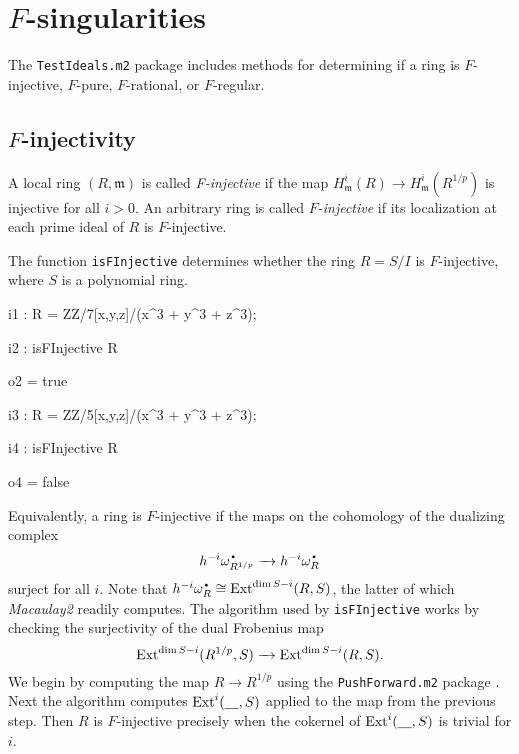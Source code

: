 \documentclass{amsart}
\begin{document}
\section{$F$-singularities}\label{Section: F-singularities}

The \texttt{TestIdeals.m2} package includes methods for determining if a ring is $F$-injective, $F$-pure, $F$-rational, or $F$-regular.

\subsection{$F$-injectivity}

\begin{definition}
A local ring $(R, \mathfrak{m})$ is called \emph{F-injective} if the map
$H^{i}_{\mathfrak{m}}(R) \rightarrow H^{i}_{\mathfrak{m}}(R^{1/p})$ is
injective for all $i >0$. An arbitrary ring is called \emph{$F$-injective} if its
localization at each prime ideal of $R$ is $F$-injective.
\end{definition}

The function \texttt{isFInjective} determines whether the ring $R = S/I$ is
$F$-injective, where $S$ is a polynomial ring.

\medskip
{\small{}
\begin{MyVerbatim}
i1 : R = ZZ/7[x,y,z]/(x^3 + y^3 + z^3);

i2 : isFInjective R

o2 = true

i3 : R = ZZ/5[x,y,z]/(x^3 + y^3 + z^3);

i4 : isFInjective R

o4 = false
\end{MyVerbatim}
}\medskip

Equivalently, a ring is $F$-injective if the maps on the cohomology of the dualizing complex
\[
h^{-i} \omega_{R^{1/p}}^{\mydot} \to h^{-i} \omega_R^{\mydot}
\]
surject for all $i$.
Note that $h^{-i} \omega_R^{\mydot} \cong \Ext^{\dim S - i}(R, S)$, the latter of which \emph{Macaulay2} readily computes.
The algorithm used by \texttt{isFInjective} works by checking the surjectivity of the dual Frobenius map
\[
\operatorname{Ext}^{\dim S - i}(R^{1/p}, S) \xrightarrow{\ \ } \operatorname{Ext}^{\dim S - i}(R, S).
\]
We begin by computing the map $R
\rightarrow R^{1/p}$ using the \texttt{PushForward.m2} package \cite{PushForward}.
Next the algorithm computes
$\operatorname{Ext}^{i}( \underline{\hskip 10pt}, S)$ applied to the map from the previous step.  Then $R$ is $F$-injective precisely when the
cokernel of $\operatorname{Ext}^{i}( \underline{\hskip 10pt}, S)$ is trivial for $i$.
\end{document}
